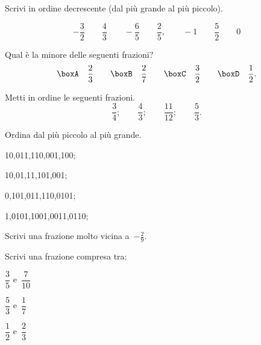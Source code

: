 \begin{esercizio}
 \label{ese:3.33}
Scrivi in ordine decrescente (dal più grande al più piccolo).

\[-\frac{3}{2} \qquad \frac{4}{3} \qquad -\frac{6}{5} \qquad \frac{2}{5},
\qquad-1 \qquad \frac{5}{2} \qquad 0\]
\end{esercizio}

 \begin{esercizio}
\label{ese:3.34}
Qual è la minore delle seguenti frazioni?
\[\boxA\quad\frac{2}{3}\qquad
\boxB\quad\frac{2}{7}\qquad
\boxC\quad\frac{3}{2}\qquad
\boxD\quad\frac{1}{2}.\]
\end{esercizio}

\begin{esercizio}
\label{ese:3.35}
Metti in ordine le seguenti frazioni.
\[\frac{3}{4};\qquad\frac{4}{3};\qquad\frac{11}{12};\qquad\frac{5}{3}.\]
\end{esercizio}

\begin{esercizio}
 \label{ese:3.36}
Ordina dal più piccolo al più grande.
\begin{enumeratea}
\item 10,011,110,001,100;
\item 10,01,11,101,001;
\item 0,101,011,110,0101;
\item 1,0101,1001,0011,0110;
\end{enumeratea}
\end{esercizio}

\begin{esercizio}
\label{ese:3.37}
Scrivi una frazione molto vicina a~$-\frac{2}{9}.$
\end{esercizio}

\begin{esercizio}
\label{ese:3.38}
Scrivi una frazione compresa tra:
\begin{multicols}{3}
\begin{enumeratea}
\item $\dfrac{3}{5}$ e~$\dfrac{7}{10}$
\item $\dfrac{5}{3}$ e~$\dfrac{1}{7}$
\item $\dfrac{1}{2}$ e~$\dfrac{2}{3}$
\end{enumeratea}
\end{multicols}
\end{esercizio}

